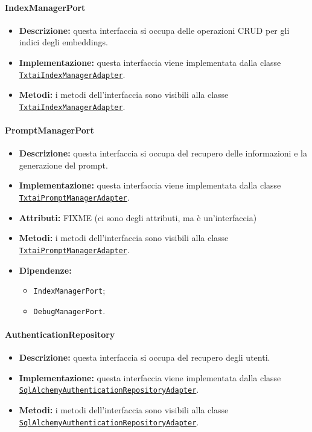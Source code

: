 \paragraph{IndexManagerPort} \label{IndexManagerPort}
\begin{itemize}
    \item \textbf{Descrizione:} questa interfaccia si occupa delle operazioni CRUD per gli indici degli embeddings.
    \item \textbf{Implementazione:} questa interfaccia viene implementata dalla classe \hyperref[TxtaiIndexManagerAdapter]{\texttt{TxtaiIndexManagerAdapter}}.
    \item \textbf{Metodi:} i metodi dell'interfaccia sono visibili alla classe \hyperref[TxtaiIndexManagerAdapter]{\texttt{TxtaiIndexManagerAdapter}}.
\end{itemize} 

\paragraph{PromptManagerPort} \label{PromptManagerPort}
\begin{itemize}
    \item \textbf{Descrizione:} questa interfaccia si occupa del recupero delle informazioni e la generazione del prompt.
    \item \textbf{Implementazione:} questa interfaccia viene implementata dalla classe \hyperref[TxtaiPromptManagerAdapter]{\texttt{TxtaiPromptManagerAdapter}}. 
    \item \textbf{Attributi:} FIXME (ci sono degli attributi, ma è un'interfaccia)
    \item \textbf{Metodi:} i metodi dell'interfaccia sono visibili alla classe \hyperref[TxtaiPromptManagerAdapter]{\texttt{TxtaiPromptManagerAdapter}}.
    \item \textbf{Dipendenze:}
    \begin{itemize}
        \item \texttt{IndexManagerPort};
        \item \texttt{DebugManagerPort}.
    \end{itemize}
\end{itemize} 

\paragraph{AuthenticationRepository} \label{AuthenticationRepository}
\begin{itemize}
    \item \textbf{Descrizione:} questa interfaccia si occupa del recupero degli utenti.
    \item \textbf{Implementazione:} questa interfaccia viene implementata dalla classe \hyperref[SqlAlchemyAuthenticationRepositoryAdapter]{\texttt{SqlAlchemyAuthenticationRepositoryAdapter}}.
    \item \textbf{Metodi:} i metodi dell'interfaccia sono visibili alla classe \hyperref[SqlAlchemyAuthenticationRepositoryAdapter]{\texttt{SqlAlchemyAuthenticationRepositoryAdapter}}.
\end{itemize} 

